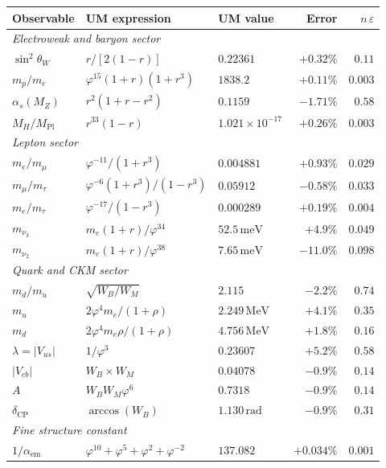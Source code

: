 \documentclass[12pt]{article}
\begin{document}
\begin{center}
\begin{tabular}{lllrr}
\toprule
Observable & UM expression & UM value & Error & $n\,\varepsilon$ \\
\midrule
\multicolumn{5}{l}{\textit{Electroweak and baryon sector}} \\
$\sin^2\!\theta_W$ & $r/[2(1-r)]$ & $0.22361$ & $+0.32\%$ & $0.11$ \\
$m_p/m_e$          & $\varphi^{15}(1+r)(1+r^3)$ & $1838.2$ & $+0.11\%$ & $0.003$ \\
$\alpha_s(M_Z)$    & $r^2(1+r-r^2)$ & $0.1159$ & $-1.71\%$ & $0.58$ \\
$M_H/M_{\text{Pl}}$ & $r^{33}(1-r)$ & $1.021\!\times\!10^{-17}$ & $+0.26\%$ & $0.003$ \\
\midrule
\multicolumn{5}{l}{\textit{Lepton sector}} \\
$m_e/m_\mu$        & $\varphi^{-11}/(1+r^3)$ & $0.004881$ & $+0.93\%$ & $0.029$ \\
$m_\mu/m_\tau$     & $\varphi^{-6}(1+r^3)/(1-r^3)$ & $0.05912$ & $-0.58\%$ & $0.033$ \\
$m_e/m_\tau$       & $\varphi^{-17}/(1-r^3)$ & $0.000289$ & $+0.19\%$ & $0.004$ \\
$m_{\nu_3}$        & $m_e(1+r)/\varphi^{34}$ & $52.5\,\text{meV}$ & $+4.9\%$ & $0.049$ \\
$m_{\nu_2}$        & $m_e(1+r)/\varphi^{38}$ & $7.65\,\text{meV}$ & $-11.0\%$ & $0.098$ \\
\midrule
\multicolumn{5}{l}{\textit{Quark and CKM sector}} \\
$m_d/m_u$          & $\sqrt{W_B/W_M}$ & $2.115$ & $-2.2\%$ & $0.74$ \\
$m_u$              & $2\varphi^4 m_e/(1+\rho)$ & $2.249\,\text{MeV}$ & $+4.1\%$ & $0.35$ \\
$m_d$              & $2\varphi^4 m_e\rho/(1+\rho)$ & $4.756\,\text{MeV}$ & $+1.8\%$ & $0.16$ \\
$\lambda=|V_{us}|$ & $1/\varphi^3$ & $0.23607$ & $+5.2\%$ & $0.58$ \\
$|V_{cb}|$         & $W_B \times W_M$ & $0.04078$ & $-0.9\%$ & $0.14$ \\
$A$                & $W_B W_M\varphi^6$ & $0.7318$ & $-0.9\%$ & $0.14$ \\
$\delta_{\text{CP}}$ & $\arccos(W_B)$ & $1.130\,\text{rad}$ & $-0.9\%$ & $0.31$ \\
\midrule
\multicolumn{5}{l}{\textit{Fine structure constant}} \\
$1/\alpha_{\text{em}}$ & $\varphi^{10}+\varphi^5+\varphi^2+\varphi^{-2}$ & $137.082$ & $+0.034\%$ & $0.001$ \\

\end{tabular}
\end{center}
\end{document}
